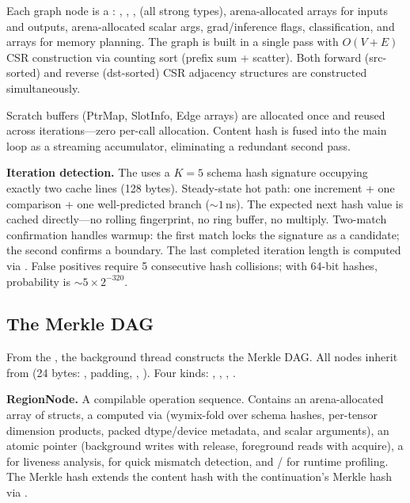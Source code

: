 Each graph node is a : , , ,  (all strong  types), arena-allocated  arrays for inputs and outputs, arena-allocated scalar args, grad/inference flags,  classification, and  arrays for memory planning.
The graph is built in a single pass with $O(V{+}E)$ CSR construction via counting sort (prefix sum + scatter).
Both forward (src-sorted) and reverse (dst-sorted) CSR adjacency structures are constructed simultaneously.

Scratch buffers (PtrMap, SlotInfo, Edge arrays) are allocated once and reused across iterations---zero per-call allocation.
Content hash is fused into the main loop as a streaming accumulator, eliminating a redundant second pass.

\textbf{Iteration detection.}
The  uses a $K{=}5$ schema hash signature occupying exactly two cache lines (128 bytes).
Steady-state hot path: one increment + one comparison + one well-predicted branch (${\sim}1$\,ns).
The expected next hash value is cached directly---no rolling fingerprint, no ring buffer, no multiply.
Two-match confirmation handles warmup: the first match locks the signature as a candidate; the second confirms a boundary.
The last completed iteration length is computed via .
False positives require 5 consecutive hash collisions; with 64-bit hashes, probability is ${\sim}5 \times 2^{-320}$.

\subsection{The Merkle DAG}

From the , the background thread constructs the Merkle DAG.
All nodes inherit from  (24 bytes: , padding, , ).
Four kinds: , , , .

\textbf{RegionNode.}
A compilable operation sequence.
Contains an arena-allocated array of  structs, a  computed via  (wymix-fold over schema hashes, per-tensor dimension products, packed dtype/device metadata, and scalar arguments), an atomic  pointer (background writes with release, foreground reads with acquire), a  for liveness analysis,  for quick mismatch detection, and / for runtime profiling.
The Merkle hash extends the content hash with the continuation's Merkle hash via .

